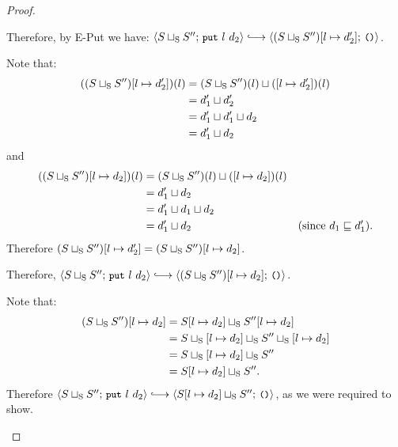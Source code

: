 \begin{proof}
\begin{itemize}
\begin{itemize}
      Therefore, by {\sc E-Put} we have:
      $\config{\lubstore{S}{S''}}{\putexp{l}{d_2}} \parstepsto
      \config{\extSRaw{(\lubstore{S}{S''})}{l}{d'_2}}{\unit}$.


      Note that:
      \begin{align*}
        ((S \sqcup_{\mathrm{S}} S'')[l \mapsto d'_2])(l) &=
        (S \sqcup_{\mathrm{S}} S'')(l) \sqcup (\left[ l \mapsto d'_2 \right])(l) \\ &=
        d'_1 \sqcup d'_2 \\ &=
        d'_1 \sqcup d'_1 \sqcup d_2 \\ &=
        d'_1 \sqcup d_2
      \end{align*}
      and
      \begin{align*}
        ((S \sqcup_{\mathrm{S}} S'')[l \mapsto d_2])(l) &=
        (S \sqcup_{\mathrm{S}} S'')(l) \sqcup (\left[ l \mapsto d_2 \right])(l) \\ &=
        d'_1 \sqcup d_2 \\ &=
        d'_1 \sqcup d_1 \sqcup d_2 \\ &=
        d'_1 \sqcup d_2 & \textrm{(since $d_1 \sqsubseteq d'_1$).}
      \end{align*}
      Therefore $(S \sqcup_{\mathrm{S}} S'')[l \mapsto d'_2] =
      (S \sqcup_{\mathrm{S}} S'')[l \mapsto d_2]$.

      Therefore, $\config{\lubstore{S}{S''}}{\putexp{l}{d_2}}
      \parstepsto
      \config{\extSRaw{(\lubstore{S}{S''})}{l}{d_2}}{\unit}$.
    \end{itemize}

    Note that:
    \begin{align*}
      (S \sqcup_{\mathrm{S}} S'')[l \mapsto d_2] &=
      S[l \mapsto d_2] \sqcup_{\mathrm{S}} S''[l \mapsto d_2] \\ &=
      S \sqcup_{\mathrm{S}} \left[ l \mapsto d_2 \right] \sqcup_{\mathrm{S}} S'' \sqcup_{\mathrm{S}} \left[ l \mapsto d_2 \right] \\ &=
      S \sqcup_{\mathrm{S}} \left[ l \mapsto d_2 \right] \sqcup_{\mathrm{S}} S'' \\ &=
      S[l \mapsto d_2] \sqcup_{\mathrm{S}} S''.
    \end{align*}
    Therefore $\config{\lubstore{S}{S''}}{\putexp{l}{d_2}} \parstepsto
    \config{\lubstore{\extSRaw{S}{l}{d_2}}{S''}}{\unit}$, as we were
    required to show.


\end{itemize}
\end{proof}
